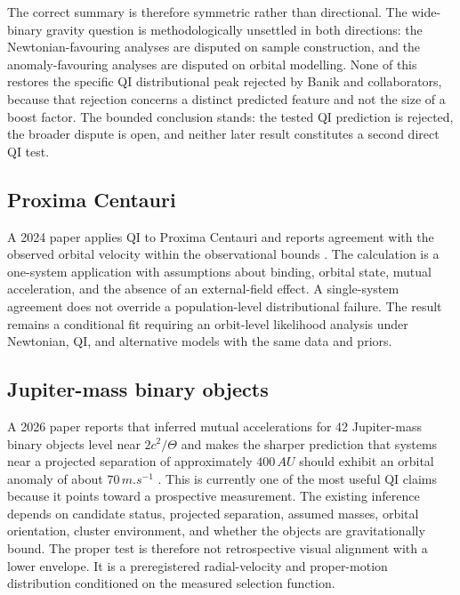 \documentclass[11pt]{article}
\begin{document}
The correct summary is therefore symmetric rather than directional. The wide-binary gravity question is methodologically unsettled in both directions: the Newtonian-favouring analyses are disputed on sample construction, and the anomaly-favouring analyses are disputed on orbital modelling. None of this restores the specific QI distributional peak rejected by Banik and collaborators, because that rejection concerns a distinct predicted feature and not the size of a boost factor. The bounded conclusion stands: the tested QI prediction is rejected, the broader dispute is open, and neither later result constitutes a second direct QI test.

\subsection{Proxima Centauri}

A 2024 paper applies QI to Proxima Centauri and reports agreement with the observed orbital velocity within the observational bounds \cite{McCulloch2024Proxima}. The calculation is a one-system application with assumptions about binding, orbital state, mutual acceleration, and the absence of an external-field effect. A single-system agreement does not override a population-level distributional failure. The result remains a conditional fit requiring an orbit-level likelihood analysis under Newtonian, QI, and alternative models with the same data and priors.

\subsection{Jupiter-mass binary objects}

A 2026 paper reports that inferred mutual accelerations for 42 Jupiter-mass binary objects level near \(2c^{2}/\Theta\) and makes the sharper prediction that systems near a projected separation of approximately \(400\,\si{AU}\) should exhibit an orbital anomaly of about \(70\,\si{m.s^{-1}}\) \cite{McCulloch2026JuMBO,PearsonMcCaughrean2023}. This is currently one of the most useful QI claims because it points toward a prospective measurement. The existing inference depends on candidate status, projected separation, assumed masses, orbital orientation, cluster environment, and whether the objects are gravitationally bound. The proper test is therefore not retrospective visual alignment with a lower envelope. It is a preregistered radial-velocity and proper-motion distribution conditioned on the measured selection function.
\end{document}
